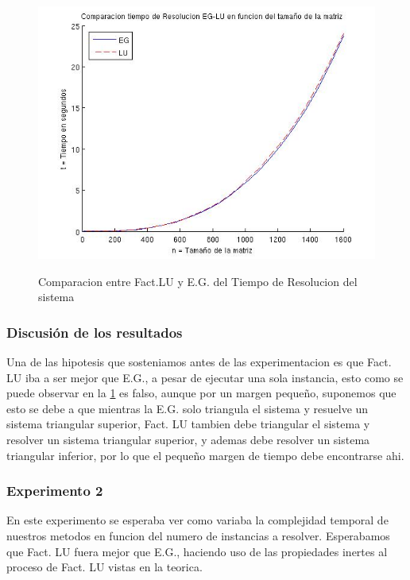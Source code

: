 \documentclass[12pt,a4paper]{article}
\begin{document}
\begin{figure}[h!]
\centering
\caption{Comparacion entre Fact.LU y E.G. del Tiempo de Resolucion del sistema}
\includegraphics[width=12cm]{ComparacionLUEG.jpg}
\label{Exp1Comp}
\end{figure}

\subsubsection{Discusión de los resultados}

Una de las hipotesis que sosteniamos antes de las experimentacion es que Fact. LU iba a ser mejor que E.G., a pesar de ejecutar una sola instancia, esto como se puede observar en la \ref{Exp1Comp} es falso, aunque por un margen pequeño, suponemos que esto se debe a que mientras la E.G. solo triangula el sistema y resuelve un sistema triangular superior, Fact. LU tambien debe triangular el sistema y resolver un sistema triangular superior, y ademas debe resolver un sistema triangular inferior, por lo que el pequeño margen de tiempo debe encontrarse ahi.

\subsubsection{Experimento 2}
En este experimento se esperaba ver como variaba la complejidad temporal de nuestros metodos en funcion del numero de instancias a resolver. Esperabamos que Fact. LU fuera mejor que E.G., haciendo uso de las propiedades inertes al proceso de Fact. LU vistas en la teorica.
\\
\end{document}
